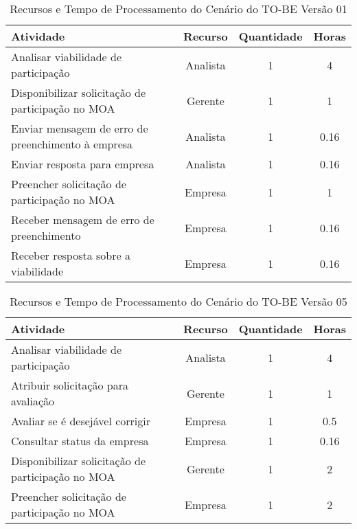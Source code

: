 \begin{table}[H]
	\centering
	\begin{tabular}{|p{5cm}|c|c|c|}
		\hline
		\textbf{Atividade} & \textbf{Recurso} & \textbf{Quantidade} & \textbf{Horas} \\ \hline
		Analisar viabilidade de participação & Analista & 1 & 4 \\ \hline
		Disponibilizar solicitação de participação no MOA & Gerente & 1 & 1 \\ \hline
		Enviar mensagem de erro de preenchimento à empresa & Analista & 1 & 0.16 \\ \hline
		Enviar resposta para empresa & Analista & 1 & 0.16 \\ \hline
		Preencher solicitação de participação no MOA & Empresa & 1 & 1 \\ \hline
		Receber mensagem de erro de preenchimento & Empresa & 1 & 0.16 \\ \hline
		Receber resposta sobre a viabilidade & Empresa & 1 & 0.16 \\ \hline
	\end{tabular}
	\caption[Recursos e Tempo de Processamento do Cenário do TO-BE Versão 01]{Recursos e Tempo de Processamento do Cenário do TO-BE Versão 01}
\end{table}

\begin{table}[H]
	\centering
	\begin{tabular}{|p{5cm}|c|c|c|}
		\hline
		\textbf{Atividade} & \textbf{Recurso} & \textbf{Quantidade} & \textbf{Horas} \\ \hline
		Analisar viabilidade de participação & Analista & 1 & 4 \\ \hline
		Atribuir solicitação para avaliação & Gerente & 1 & 1 \\ \hline
		Avaliar se é desejável corrigir & Empresa & 1 & 0.5 \\ \hline
		Consultar status da empresa & Empresa & 1 & 0.16 \\ \hline
		Disponibilizar solicitação de participação no MOA & Gerente & 1 & 2 \\ \hline
		Preencher solicitação de participação no MOA & Empresa & 1 & 2 \\ \hline
	\end{tabular}
	\caption[Recursos e Tempo de Processamento do Cenário do TO-BE Versão 05]{Recursos e Tempo de Processamento do Cenário do TO-BE Versão 05}
\end{table}